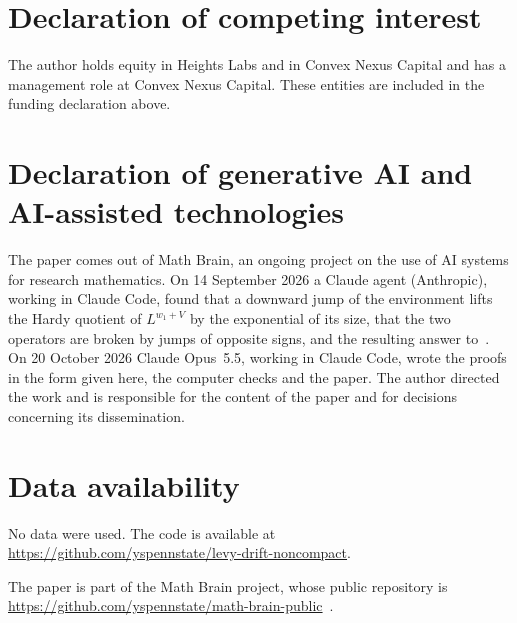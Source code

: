 \documentclass[11pt]{amsart}
\theoremstyle{remark}
\begin{document}
\section*{Declaration of competing interest}
The author holds equity in Heights Labs and in Convex Nexus Capital and
has a management role at Convex Nexus Capital. These entities are included
in the funding declaration above.

\section*{Declaration of generative AI and AI-assisted technologies}
The paper comes out of Math Brain, an ongoing project on the use of AI systems for research mathematics. On 14 September 2026 a Claude agent (Anthropic), working in Claude Code, found that a downward jump of the environment lifts the Hardy quotient of $L^{w_1+V}$ by the exponential of its size, that the two operators are broken by jumps of opposite signs, and the resulting answer to~\cite[Remark~5.3(ii)]{SW}. On 20 October 2026 Claude Opus~5.5, working in Claude Code, wrote the proofs in the form given here, the computer checks and the paper. The author directed the work and is responsible for the content of the paper and for decisions concerning its dissemination.

\section*{Data availability}
No data were used. The code is available at\\ \url{https://github.com/yspennstate/levy-drift-noncompact}.

The paper is part of the Math Brain project, whose public repository is \url{https://github.com/yspennstate/math-brain-public}~\cite{MathBrainRepo}.
\end{document}
